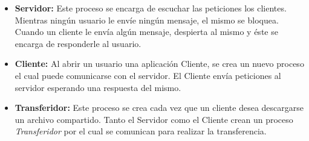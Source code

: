\documentclass[a4paper,10pt]{article}
\begin{document}
			\begin{itemize}
				\item \textbf{Servidor:} Este proceso se encarga de escuchar las peticiones los clientes. Mientras ning\'un usuario le env\'ie ning\'un 
				mensaje, el mismo se bloquea. Cuando un cliente le env\'ia alg\'un mensaje, despierta al mismo y \'este se encarga de responderle al 
				usuario.
				\item \textbf{Cliente:} Al abrir un usuario una aplicaci\'on Cliente, se crea un nuevo proceso el cual puede comunicarse con el servidor.
				El Cliente env\'ia peticiones al servidor esperando una respuesta del mismo.
				\item \textbf{Transferidor:} Este proceso se crea cada vez que un cliente desea descargarse un archivo compartido. Tanto el Servidor como
				el Cliente crean un proceso \emph{Transferidor} por el cual se comunican para realizar la transferencia.
			\end{itemize}
\end{document}
